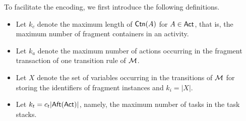 To facilitate the encoding, we first introduce the following definitions. %
\begin{itemize}
\item Let $k_c$ denote the maximum length of ${\sf Ctn}(A)$ for $A \in {\sf Act}$, that is, the maximum number of fragment containers in an activity. 
%
\item Let $k_a$ denote the maximum number of actions occurring in the fragment transaction of one transition rule of ${\mathcal{M} }$.
%
\item Let $X$ denote the set of variables occurring in the transitions of ${\mathcal{M} }$ for storing the identifiers of fragment instances and $k_i = |X|$.
%
\item Let $k_t = c_t|{\sf Aft}({\sf Act})|$, namely, the maximum number of tasks in the task stacks. 
\end{itemize}


